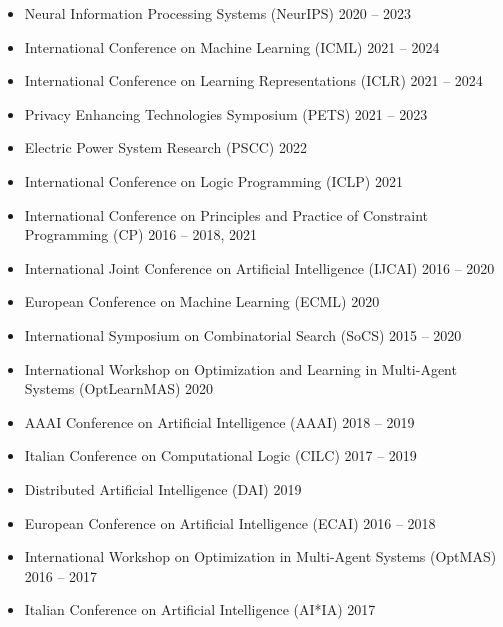 \begin{itemize}
  \item Neural Information Processing Systems (NeurIPS) 
  \hfill {2020 -- 2023}

  \item International Conference on Machine Learning (ICML) 
  \hfill{2021 -- 2024} 

  \item International Conference on Learning Representations (ICLR)
  \hfill{2021 -- 2024}

  \item Privacy Enhancing Technologies Symposium (PETS) 
  \hfill {2021 -- 2023}

  \item Electric Power System Research (PSCC)
  \hfill{2022}

  \item International Conference on Logic Programming (ICLP) 
  \hfill {2021}

  \item International Conference on Principles and Practice of Constraint Programming (CP) 
  \hfill{2016 -- 2018, 2021} 

  \item International Joint Conference on Artificial Intelligence (IJCAI) 
  \hfill {2016 -- 2020}

  \item European Conference on Machine Learning (ECML) 
  \hfill {2020}

  \item International Symposium on Combinatorial Search (SoCS) 
  \hfill {2015 -- 2020}

  \item International Workshop on Optimization and Learning in 
        Multi-Agent Systems (OptLearnMAS) 
  \hfill {2020}

  \item AAAI Conference on Artificial Intelligence (AAAI) 
  \hfill {2018 -- 2019}

  \item Italian Conference on Computational Logic (CILC) 
  \hfill {2017 -- 2019}

  \item Distributed Artificial Intelligence (DAI) 
  \hfill {2019}

  \item European Conference on Artificial Intelligence (ECAI) 
  \hfill {2016 -- 2018}

  \item International Workshop on Optimization in Multi-Agent Systems (OptMAS) 
  \hfill {2016 -- 2017}

  \item Italian Conference on Artificial Intelligence (AI*IA) 
  \hfill {2017}
\end{itemize}


